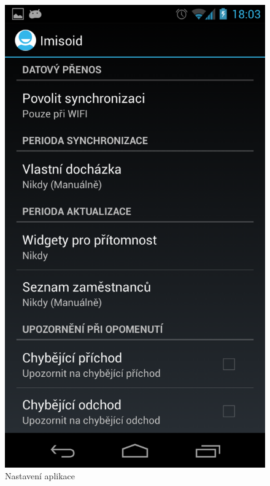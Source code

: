 \documentclass{diplomka}
\begin{document}
\begin{figure}[H]
\centering
\begin{minipage}{.45\textwidth}
  \centering
  \includegraphics[width=.9\linewidth]{scr/settings1.png}
   \caption{Nastavení aplikace}
  \label{fig:settings1}
\end{minipage}\hfill%
\begin{minipage}{.45\textwidth}
   \centering

\end{minipage}
\end{figure}
\end{document}
